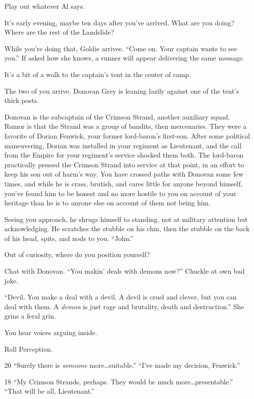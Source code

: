 \begin{multicols}{2}
Play out whatever Al says.

\hrulefill

It's early evening, maybe ten days after you've arrived.
What are you doing?
Where are the rest of the Landslide?

While you're doing that, Goldie arrives.
``Come on.
  Your captain wants to see you.''
If asked how she knows, a runner will appear delivering the same message.

It's a bit of a walk to the captain's tent in the center of camp.

The two of you arrive.
Donovan Grey is leaning lazily against one of the tent's thick posts.

Donovan is the subcaptain of the Crimson Strand, another auxiliary squad.
Rumor is that the Strand was a group of bandits, then mercenaries.
They were a favorite of Dorian Fenwick, your former lord-baron's first-son.
After some political maneuvering, Dorian was installed in your regiment as Lieutenant,
  and the call from the Empire for your regiment's service shocked them both.
The lord-baron practically pressed the Crimson Strand into service at that point, in an effort to
  keep his son out of harm's way.
You have crossed paths with Donovan some few times, and while he is crass, brutish, and
  cares little for anyone beyond himself, you've found him to be honest and no more hostile to you
  on account of your heritage than he is to anyone else on account of them not being him.

Seeing you approach, he shrugs himself to standing, not at military attention but acknowledging.
He scratches the stubble on his chin, then the stubble on the back of his head, spits,
  and nods to you.
``John.''

Out of curiosity, where do you position yourself?

Chat with Donovan.
``You makin' deals with demons now?''
Chuckle at own bad joke.

``Devil.
  You make a deal with a devil.
  A devil is cruel and clever, but you can deal with them.
  A \emph{demon} is just rage and brutality, death and destruction.''
She grins a feral grin.

You hear voices arguing inside.

Roll Perception.

20
``Surely there is \emph{someone} more\dots suitable.''
``I've made my decision, Fenwick.''

18
``My Crimson Strands, perhaps.
  They would be much more\dots presentable.''
``That will be all, Lieutenant.''


\end{multicols}

